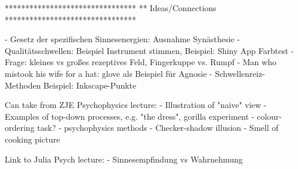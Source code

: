 ********************************
** Ideas/Connections
********************************

- Gesetz der spezifischen Sinnesenergien: Ausnahme Synästhesie
- Qualitätsschwellen: Beispiel Instrument stimmen, Beispiel: Shiny App Farbtest
- Frage: kleines vs großes rezeptives Feld, Fingerkuppe vs. Rumpf 
- Man who mistook his wife for a hat: glove als Beispiel für Agnosie
- Schwellenreiz-Methoden Beispiel: Inkscape-Punkte




Can take from ZJE Psychophysics lecture:
- Illustration of "naive"  view
- Examples of top-down processes, e.g. "the dress", gorilla experiment
- colour-ordering task? 
- psychophysics methods 
- Checker-shadow illusion
- Smell of cooking picture

Link to Julia Psych  lecture:
- Sinnesempfindung vs Wahrnehmung
